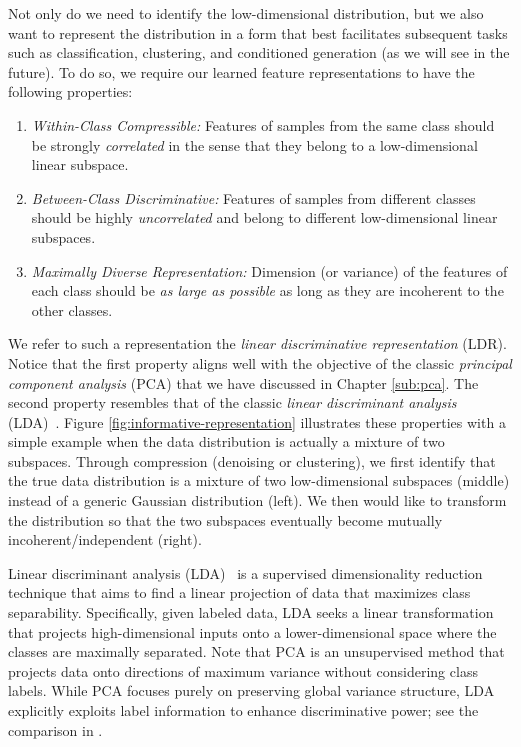 \documentclass[../../book-main.tex]{subfiles}
\begin{document}
Not only do we need to identify the low-dimensional distribution, but we also want to represent the distribution in a form that best facilitates subsequent tasks such as classification, clustering, and conditioned generation (as we will see in the future). To do so, we require our learned feature representations to have the following properties:
\begin{enumerate}
	\item {\em Within-Class Compressible:} Features of samples from the same class should be strongly {\em correlated} in the sense that they belong to a low-dimensional linear subspace.
	\item {\em Between-Class Discriminative:} Features of samples from different classes should be highly {\em uncorrelated} and belong to different low-dimensional linear subspaces.
	\item {\em Maximally Diverse Representation:} Dimension (or variance) of the features of each class should be {\em as large as possible} as long as they are incoherent to the other classes.
\end{enumerate}
We refer to such a representation the {\em linear discriminative representation} (LDR). Notice that the first property aligns well with the objective of the classic  {\em principal component analysis} (PCA) that we have discussed in Chapter \ref{sub:pca}. The second property resembles that of the classic {\em  linear discriminant analysis} (LDA)~\cite{HastieTiFr09}. Figure \ref{fig:informative-representation} illustrates these properties with a simple example when the data distribution is actually a mixture of two subspaces. Through compression (denoising or clustering), we first identify that the true data distribution is a mixture of two low-dimensional subspaces (middle) instead of a generic Gaussian distribution (left). We then would like to transform the distribution so that the two subspaces eventually become mutually incoherent/independent (right). 

\begin{remark}
    Linear discriminant analysis (LDA)~\cite{HastieTiFr09} is a supervised dimensionality reduction technique that aims to find a linear projection of data that maximizes class separability. Specifically, given labeled data, LDA seeks a linear transformation that projects high-dimensional inputs onto a lower-dimensional space where the classes are maximally separated. Note that PCA is an unsupervised method that projects data onto directions of maximum variance without considering class labels. While PCA focuses purely on preserving global variance structure, LDA explicitly exploits label information to enhance discriminative power; see the comparison in . 
\end{remark}
\end{document}
